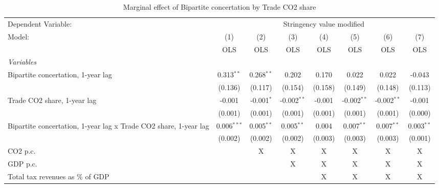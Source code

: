 
\begin{table}[htbp]
   \caption{Marginal effect of Bipartite concertation by Trade CO2 share}
   \centering
   \begin{tabular}{lccccccc}
      \toprule
      Dependent Variable: & \multicolumn{7}{c}{Stringency value modified}\\
      Model:                                                           & (1)           & (2)          & (3)           & (4)     & (5)           & (6)           & (7)\\  
                                                                       &  OLS          & OLS          & OLS           & OLS     & OLS           & OLS           & OLS\\  
      \midrule
      \emph{Variables}\\
      Bipartite concertation, 1-year lag                               & 0.313$^{**}$  & 0.268$^{**}$ & 0.202         & 0.170   & 0.022         & 0.022         & -0.043\\   
                                                                       & (0.136)       & (0.117)      & (0.154)       & (0.158) & (0.149)       & (0.148)       & (0.113)\\   
      Trade CO2 share, 1-year lag                                      & -0.001        & -0.001$^{*}$ & -0.002$^{**}$ & -0.001  & -0.002$^{**}$ & -0.002$^{**}$ & -0.001\\   
                                                                       & (0.001)       & (0.001)      & (0.001)       & (0.001) & (0.001)       & (0.001)       & (0.000)\\   
      Bipartite concertation, 1-year lag x Trade CO2 share, 1-year lag & 0.006$^{***}$ & 0.005$^{**}$ & 0.005$^{**}$  & 0.004   & 0.007$^{**}$  & 0.007$^{**}$  & 0.003$^{**}$\\   
                                                                       & (0.002)       & (0.002)      & (0.002)       & (0.003) & (0.003)       & (0.003)       & (0.001)\\   
      CO2 p.c.                                                         &               & X            & X             & X       & X             & X             & X\\  
      GDP p.c.                                                         &               &              & X             & X       & X             & X             & X\\  
      Total tax revenues as \% of GDP                                  &               &              &               & X       & X             & X             & X\\  

\end{tabular}
\end{table}
